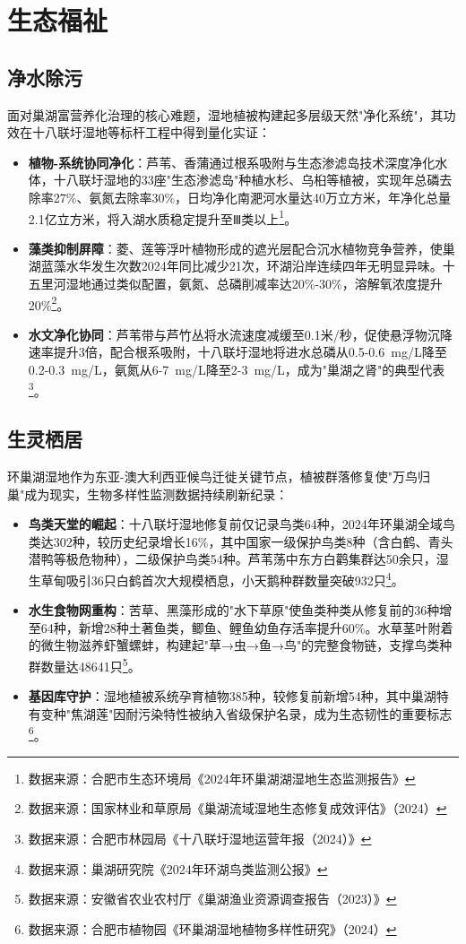
\section{生态福祉}

\subsection{净水除污}
面对巢湖富营养化治理的核心难题，湿地植被构建起多层级天然"净化系统"，其功效在十八联圩湿地等标杆工程中得到量化实证：
\begin{itemize}
    \item \textbf{植物-系统协同净化}：芦苇、香蒲通过根系吸附与生态渗滤岛技术深度净化水体，十八联圩湿地的33座"生态渗滤岛"种植水杉、乌桕等植被，实现年总磷去除率27\%、氨氮去除率30\%，日均净化南淝河水量达40万立方米，年净化总量2.1亿立方米，将入湖水质稳定提升至Ⅲ类以上\footnote{数据来源：合肥市生态环境局《2024年环巢湖湖湿地生态监测报告》}。
    \item \textbf{藻类抑制屏障}：菱、莲等浮叶植物形成的遮光层配合沉水植物竞争营养，使巢湖蓝藻水华发生次数2024年同比减少21次，环湖沿岸连续四年无明显异味。十五里河湿地通过类似配置，氨氮、总磷削减率达20\%-30\%，溶解氧浓度提升20\%\footnote{数据来源：国家林业和草原局《巢湖流域湿地生态修复成效评估》（2024）}。
    \item \textbf{水文净化协同}：芦苇带与芦竹丛将水流速度减缓至0.1米/秒，促使悬浮物沉降速率提升3倍，配合根系吸附，十八联圩湿地将进水总磷从0.5-0.6~mg/L降至0.2-0.3~mg/L，氨氮从6-7~mg/L降至2-3~mg/L，成为"巢湖之肾"的典型代表\footnote{数据来源：合肥市林园局《十八联圩湿地运营年报（2024）》}。
\end{itemize}

\subsection{生灵栖居}
环巢湖湿地作为东亚-澳大利西亚候鸟迁徙关键节点，植被群落修复使"万鸟归巢"成为现实，生物多样性监测数据持续刷新纪录：
\begin{itemize}
    \item \textbf{鸟类天堂的崛起}：十八联圩湿地修复前仅记录鸟类64种，2024年环巢湖全域鸟类达302种，较历史纪录增长16\%，其中国家一级保护鸟类8种（含白鹤、青头潜鸭等极危物种），二级保护鸟类54种。芦苇荡中东方白鹳集群达50余只，湿生草甸吸引36只白鹤首次大规模栖息，小天鹅种群数量突破932只\footnote{数据来源：巢湖研究院《2024年环湖鸟类监测公报》}。
    \item \textbf{水生食物网重构}：苦草、黑藻形成的"水下草原"使鱼类种类从修复前的36种增至64种，新增28种土著鱼类，鲫鱼、鲤鱼幼鱼存活率提升60\%。水草茎叶附着的微生物滋养虾蟹螺蚌，构建起"草→虫→鱼→鸟"的完整食物链，支撑鸟类种群数量达48641只\footnote{数据来源：安徽省农业农村厅《巢湖渔业资源调查报告（2023）》}。
    \item \textbf{基因库守护}：湿地植被系统孕育植物385种，较修复前新增54种，其中巢湖特有变种"焦湖莲"因耐污染特性被纳入省级保护名录，成为生态韧性的重要标志\footnote{数据来源：合肥市植物园《环巢湖湿地植物多样性研究》（2024）}。
\end{itemize}

